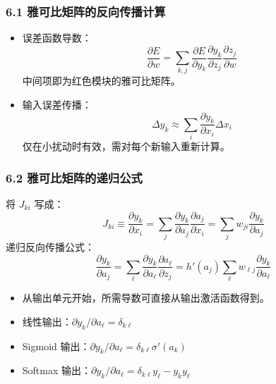 \documentclass[t,aspectratio=169]{beamer} %
\begin{document}
\begin{frame}
    \frametitle{6.1 雅可比矩阵的反向传播计算}
    \begin{itemize}
        \item 误差函数导数：
        \begin{equation}
            \frac{\partial E}{\partial w} = \sum_{k,j} \frac{\partial E}{\partial y_k} \frac{\partial y_k}{\partial z_j} \frac{\partial z_j}{\partial w}
            \tag{8.27}
        \end{equation}
        中间项即为红色模块的雅可比矩阵。
        \item 输入误差传播：
        \begin{equation}
            \Delta y_k \approx \sum_i \frac{\partial y_k}{\partial x_i} \Delta x_i
            \tag{8.28}
        \end{equation}
        仅在\alert{小扰动}时有效，需对每个新输入重新计算。
    \end{itemize}
\end{frame}

\begin{frame}
    \frametitle{6.2 雅可比矩阵的递归公式}
    将 $J_{ki}$ 写成：
    \begin{equation}
        J_{ki} \equiv \frac{\partial y_k}{\partial x_i} = \sum_j \frac{\partial y_k}{\partial a_j} \frac{\partial a_j}{\partial x_i} = \sum_j w_{ji} \frac{\partial y_k}{\partial a_j}
        \tag{8.29}
    \end{equation}
    递归反向传播公式：
    \begin{equation}
        \frac{\partial y_k}{\partial a_j} = \sum_\ell \frac{\partial y_k}{\partial a_\ell} \frac{\partial a_\ell}{\partial z_j} = h'(a_j) \sum_\ell w_{\ell j} \frac{\partial y_k}{\partial a_\ell}
        \tag{8.30}
    \end{equation}
    \begin{itemize}
        \item 从输出单元开始，所需导数可直接从输出激活函数得到。
        \item \alert{线性输出}：$\partial y_k/\partial a_\ell = \delta_{k\ell}$
        \item \alert{Sigmoid 输出}：$\partial y_k/\partial a_\ell = \delta_{k\ell} \sigma'(a_k)$
        \item \alert{Softmax 输出}：$\partial y_k/\partial a_\ell = \delta_{k\ell} y_\ell - y_k y_\ell$
    \end{itemize}
\end{frame}
\end{document}
